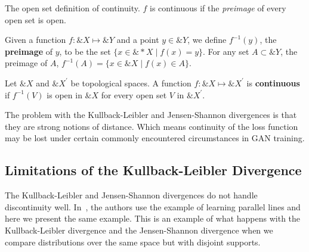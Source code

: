 The open set definition of continuity.  $f$ is continuous if the
\textit{preimage} of every open set is open.

\begin{definition}
  Given a function $f: \&X \mapsto \&Y$ and a point $y \in \&Y$, we
  define $f^{-1}(y)$, the \textbf{preimage} of $y$, to be the set
  $\{x \in \&*X \mid f(x) = y\}$.  For any set $A \subset \&Y$, the
  preimage of $A$, $f^{-1}(A) = \{x \in \&X \mid f(x) \in A\}$.
\end{definition}

\begin{definition}
  Let $\&X$ and $\&X^\prime$ be topological spaces.  A function
  $f: \&X \mapsto \&X^\prime$ is \textbf{continuous} if $f^{-1}(V)$ is
  open in $\&X$ for every open set $V$ in $\&X^\prime$.
\end{definition}

The problem with the Kullback-Leibler and Jensen-Shannon divergences
is that they are strong notions of distance. Which means continuity of
the loss function may be lost under certain commonly encountered
circumstances in GAN training.

\subsection{Limitations of the Kullback-Leibler Divergence}

The Kullback-Leibler and Jensen-Shannon divergences do not handle
discontinuity well. In~\cite{ref:arjovsky-2017}, the authors use the
example of learning parallel lines and here we present the same
example. This is an example of what happens with the Kullback-Leibler
divergence and the Jensen-Shannon divergence when we compare
distributions over the same space but with disjoint supports.

